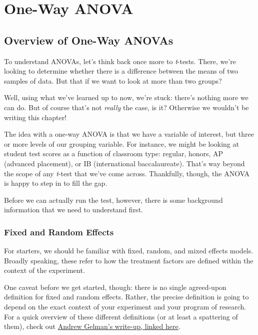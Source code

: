 
\chapter{One-Way ANOVA}

\section{Overview of One-Way ANOVAs}

To understand ANOVAs, let's think back once more to \textit{t}-tests. There, we're looking to determine whether there is a difference between the means of two samples of data. But that if we want to look at more than two groups? 

Well, using what we've learned up to now, we're stuck: there's nothing more we can do. But of course that's not \textit{really} the case, is it? Otherwise we wouldn't be writing this chapter!

The idea with a one-way ANOVA is that we have a variable of interest, but three or more levels of our grouping variable. For instance, we might be looking at student test scores as a function of classroom type: regular, honors, AP (advanced placement), or IB (international baccalaureate). That's way beyond the scope of any \textit{t}-test that we've come across. Thankfully, though, the ANOVA is happy to step in to fill the gap.

Before we can actually run the test, however, there is some background information that we need to understand first.

\subsection{Fixed and Random Effects}

For starters, we should be familiar with fixed, random, and mixed effects models. Broadly speaking, these refer to how the treatment factors are defined within the context of the experiment.

One caveat before we get started, though: there is no single agreed-upon definition for fixed and random effects. Rather, the precise definition is going to depend on the exact context of your experiment and your program of research. For a quick overview of these different definitions (or at least a spattering of them), check out \href{http://andrewgelman.com/2005/01/25/why_i_dont_use/}{Andrew Gelman's write-up, linked here}.

